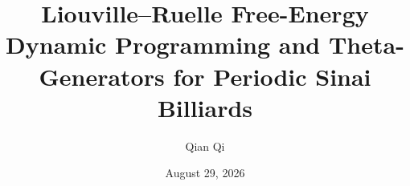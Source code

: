 \documentclass[11pt,reqno]{amsart}
\title[Sinai free-energy DPP and theta-generators]{Liouville--Ruelle Free-Energy Dynamic Programming and Theta-Generators for Periodic Sinai Billiards}
\author{Qian Qi}
\date{August 29, 2026}
\theoremstyle{definition}
\theoremstyle{remark}
\begin{document}
\raggedbottom




\end{document}
